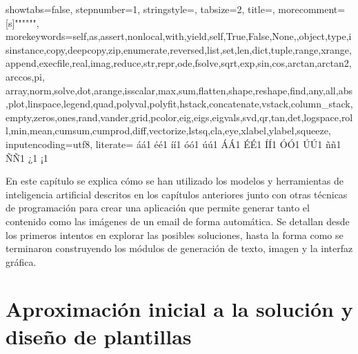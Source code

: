 {  showtabs=false,                  %
  stepnumber=1,                    %
  stringstyle=\color{mymauve},     %
  tabsize=2,	                   %
  title=\lstname,                  %
  morecomment=[s]{"""}{"""},
  morekeywords={self,as,assert,nonlocal,with,yield,self,True,False,None,,object,type,isinstance,copy,deepcopy,zip,enumerate,reversed,list,set,len,dict,tuple,range,xrange,append,execfile,real,imag,reduce,str,repr,ode,fsolve,sqrt,exp,sin,cos,arctan,arctan2,arccos,pi, array,norm,solve,dot,arange,isscalar,max,sum,flatten,shape,reshape,find,any,all,abs,plot,linspace,legend,quad,polyval,polyfit,hstack,concatenate,vstack,column_stack,empty,zeros,ones,rand,vander,grid,pcolor,eig,eigs,eigvals,svd,qr,tan,det,logspace,roll,min,mean,cumsum,cumprod,diff,vectorize,lstsq,cla,eye,xlabel,ylabel,squeeze},
  inputencoding=utf8,              %
  literate=%
    {á}{{\'a}}1 {é}{{\'e}}1 {í}{{\'i}}1 {ó}{{\'o}}1 {ú}{{\'u}}1
    {Á}{{\'A}}1 {É}{{\'E}}1 {Í}{{\'I}}1 {Ó}{{\'O}}1 {Ú}{{\'U}}1
    {ñ}{{\~n}}1 {Ñ}{{\~N}}1 {¿}{{\textquestiondown}}1 {¡}{{\textexclamdown}}1
}


En este capítulo se explica cómo se han utilizado los modelos y herramientas de inteligencia artificial descritos en los capítulos anteriores junto con otras técnicas de programación para crear una aplicación que permite generar tanto el contenido como las imágenes de un email de forma automática. Se detallan desde los primeros intentos en explorar las posibles soluciones, hasta la forma como se terminaron construyendo los módulos de generación de texto, imagen y la interfaz gráfica.


\section{Aproximación inicial a la solución y diseño de plantillas}

